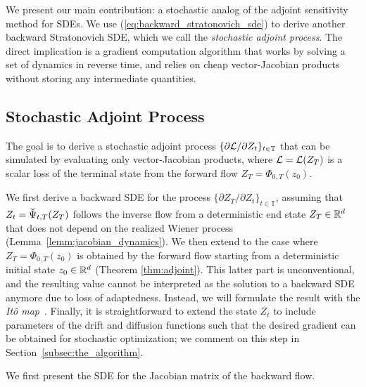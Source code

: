 \documentclass[twoside]{article}
\begin{document}
We present our main contribution: a stochastic analog of the adjoint sensitivity method for SDEs. 
We use (\ref{eq:backward_stratonovich_sde}) to derive another backward Stratonovich SDE, which we call the \textit{stochastic adjoint process}.
The direct implication is a gradient computation algorithm that works by solving a set of dynamics in reverse time, and relies on cheap vector-Jacobian products without storing any intermediate quantities.

\subsection{Stochastic Adjoint Process}
The goal is to derive a stochastic adjoint process $\{\partial \mathcal{L} / \partial Z_t\}_{t \in \mathbb{T}}$ that can be simulated by evaluating only vector-Jacobian products, where $\mathcal{L} = \mathcal{L}(Z_T)$ is a scalar loss of the terminal state from the forward flow $Z_T = \Phi_{0, T}(z_0)$.

We first derive a backward SDE for the process $\{\partial Z_T / \partial Z_t\}_{t \in \mathbb{T}}$, assuming that $Z_t = \widecheck{\Psi}_{t, T}(Z_T)$ follows the inverse flow from a deterministic end state $Z_T \in \mathbb{R}^d$ that does not depend on the realized Wiener process (Lemma~\ref{lemm:jacobian_dynamics}). 
We then extend to the case where $Z_T = \Phi_{0, T}(z_0)$ is obtained by the forward flow starting from a deterministic initial state $z_0 \in \mathbb{R}^d$ (Theorem \ref{thm:adjoint}).
This latter part is unconventional, and the resulting value cannot be interpreted as the solution to a backward SDE anymore due to loss of adaptedness. 
Instead, we will formulate the result with the \textit{It\^o map}~\cite{rogers2000diffusions2}. 
Finally, it is straightforward to extend the state $Z_t$ to include parameters of the drift and diffusion functions such that the desired gradient can be obtained for stochastic optimization; we comment on this step in Section~\ref{subsec:the_algorithm}.




We first present the SDE for the Jacobian matrix of the backward flow.
\end{document}
